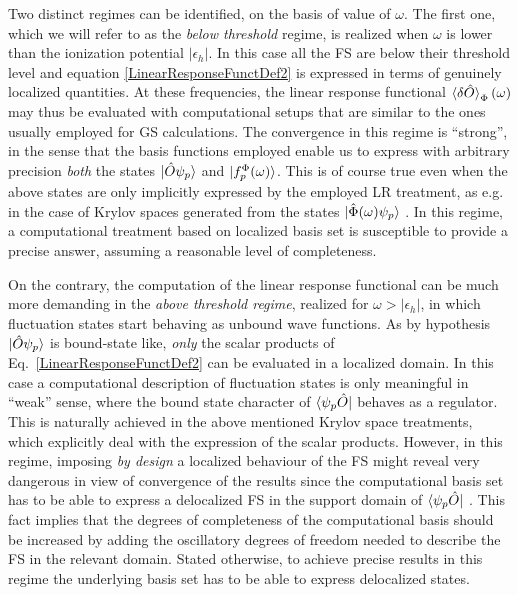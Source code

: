 \documentclass[reprint,aps,prb]{revtex4-1}
\newcommand{\eps}{\epsilon}
\newcommand{\op}[1]{\hat {#1}}
\begin{document}
Two distinct regimes can be identified, on the basis of value of $\omega$.
The first one, which we will refer to as the \emph{below threshold} regime, is realized when
$\omega$ is lower than the ionization potential $|\eps_h|$.
In this case all the FS are below their threshold level and equation \eqref{LinearResponseFunctDef2}
is expressed in terms of genuinely localized
quantities. At these frequencies, the linear response functional $\braket{\delta\op O}_\Phi(\omega)$
may thus be evaluated with computational setups that
are similar to the ones usually employed for GS calculations.
The convergence in this regime is ``strong'', in the sense that the basis functions employed enable us to express
with arbitrary precision \emph{both} the states $\ket{\op O \psi_p}$ and $\ket{f_p^\Phi(\omega)}$.
This is of course true even when the above states are only implicitly expressed by the employed LR treatment, as e.g. in the case of Krylov spaces generated from the states $\ket{\op\Phi(\omega) \psi_p}$ \cite{baroni2006,baroni2008,linlinKPM}.
In this regime, a computational treatment based on localized basis set is susceptible to provide a precise answer, assuming a reasonable level of completeness.

On the contrary, the computation of the linear response functional can be much more demanding in the \emph{above threshold regime},
realized for $\omega>|\eps_h|$, in which fluctuation states start behaving as unbound wave functions.
As by hypothesis $\ket{\op O \psi_p}$ is bound-state like, \emph{only} the scalar products of Eq.~\eqref{LinearResponseFunctDef2}
can be evaluated in a localized domain. In this case a computational description of fluctuation states is only meaningful in ``weak''
sense, where the bound state character of $\bra{\psi_p\op O}$ behaves as a regulator. This is naturally achieved in the above mentioned
Krylov space treatments, which explicitly deal with the expression of the scalar products. However, in this regime, imposing \emph{by design}
a localized behaviour of the FS might reveal very dangerous in view of convergence of the results since the computational basis set has
to be able to express a delocalized FS in the support domain of $\bra{\psi_p\op O}$ .
This fact implies that the degrees of completeness of the computational basis should be increased by adding
the oscillatory degrees of freedom needed to describe the FS in the relevant domain.
Stated otherwise, to achieve precise results in this regime the
underlying basis set has to be able to express delocalized states.
\end{document}

